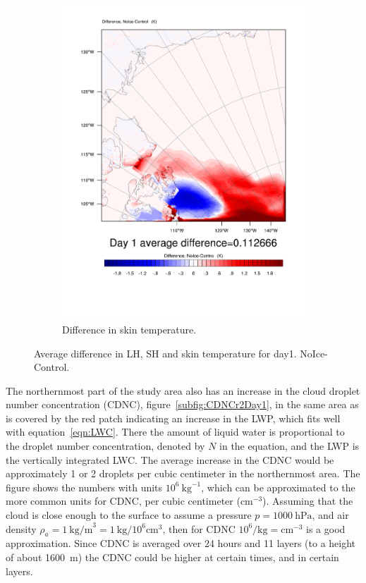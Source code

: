 \begin{figure}
		\begin{subfigure}{0.48\textwidth}
		\includegraphics[width=\textwidth]{results/noice/diff_NoIce_skintemp_Day1.pdf}
		\caption{Difference in skin temperature.}
		\label{subfig:skin_r2Day1}
	\end{subfigure}
	\caption{Average difference in LH, SH and skin temperature for day1. NoIce-Control.}
	\label{fig:lhshskin_r2Day1}
\end{figure}

The northernmost part of the study area also has an increase in the cloud droplet number concentration (CDNC), figure~\ref{subfig:CDNCr2Day1}, in the same area as is covered by the red patch indicating an increase in the LWP, which fits well with equation~\ref{eqn:LWC}. There the amount of liquid water is proportional to the droplet number concentration, denoted by $N$ in the equation, and the LWP is the vertically integrated LWC. The average increase in the CDNC would be approximately 1 or 2 droplets per cubic centimeter in the northernmost area. The figure shows the numbers with units $10^6~\text{kg}^{-1}$, which can be approximated to the more common units for CDNC, per cubic centimeter ($\text{cm}^{-3}$). Assuming that the cloud is close enough to the surface to assume a pressure $p=1000~\text{hPa}$, and air density $\rho_a = 1~\text{kg/m}^3=1~\text{kg/}10^6\text{cm}^3$, then for CDNC $10^6/\text{kg} = \text{cm}^{-3}$ is a good approximation. Since CDNC is averaged over 24 hours and 11 layers (to a height of about 1600~m) the CDNC could be higher at certain times, and in certain layers.

